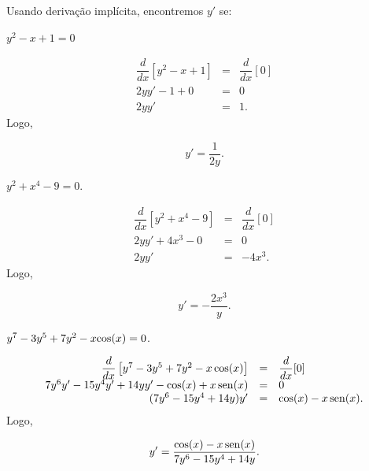 \cleardoublepage\documentclass[../main.tex]{subfiles}
\begin{document}
\begin{exeresol}
  Usando derivação implícita, encontremos \(y'\) se:
  \begin{compactenum}[a)]
    \item \(y^2-x+1=0\)
    
    \begin{solution}
        \[ \begin{array}{rcl} \dfrac{d}{dx}\left[y^2-x+1\right]&=&\dfrac{d}{dx}[0]\\ 2yy'-1+ 0 &=& 0\\ 2yy' &=& 1. \end{array} \]
Logo,

\[ y' =\dfrac{1}{2y}. \]
    \end{solution}
    \item \(y^2+x^4-9=0\).
    
    \begin{solution}
        \[ \begin{array}{rcl} \dfrac{d}{dx}\left[y^2+x^4-9\right]&=&\dfrac{d}{dx}[0]\\ 2yy'+4x^3- 0 &=& 0\\ 2yy' &=& -4x^3 . \end{array} \]
Logo,

\[ y' =-\dfrac{2x^3}{y}. \]
    \end{solution}
    \item \(y^7-3y^5+7y^2-x{\rm cos}(x)=0\).
    
    \begin{solution}
        \[ \begin{array}{rcl} \dfrac{d}{dx}\left[y^7-3y^5+7y^2-x\,{\rm cos}(x)\right]&=&\dfrac{d}{dx}[0]\\ 7y^6y'-15y^4y'+14yy'-{\rm cos}(x)+x\,{\rm sen}(x) &=& 0\\ (7y^6-15y^4+14y)y' &=& {\rm cos}(x)-x\,{\rm sen}(x) . \end{array} \]
Logo,

\[ y' =\dfrac{{\rm cos}(x)-x\,{\rm sen}(x)}{7y^6-15y^4+14y}. \]
    \end{solution}
  \end{compactenum}
\end{exeresol}
\end{document}
